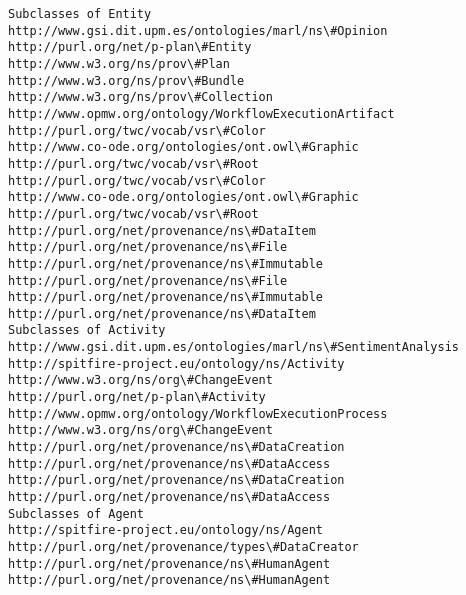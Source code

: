 \documentclass[11pt]{article}
\begin{document}
    \begin{Verbatim}[commandchars=\\\{\}]
Subclasses of Entity
http://www.gsi.dit.upm.es/ontologies/marl/ns\#Opinion
http://purl.org/net/p-plan\#Entity
http://www.w3.org/ns/prov\#Plan
http://www.w3.org/ns/prov\#Bundle
http://www.w3.org/ns/prov\#Collection
http://www.opmw.org/ontology/WorkflowExecutionArtifact
http://purl.org/twc/vocab/vsr\#Color
http://www.co-ode.org/ontologies/ont.owl\#Graphic
http://purl.org/twc/vocab/vsr\#Root
http://purl.org/twc/vocab/vsr\#Color
http://www.co-ode.org/ontologies/ont.owl\#Graphic
http://purl.org/twc/vocab/vsr\#Root
http://purl.org/net/provenance/ns\#DataItem
http://purl.org/net/provenance/ns\#File
http://purl.org/net/provenance/ns\#Immutable
http://purl.org/net/provenance/ns\#File
http://purl.org/net/provenance/ns\#Immutable
http://purl.org/net/provenance/ns\#DataItem
Subclasses of Activity
http://www.gsi.dit.upm.es/ontologies/marl/ns\#SentimentAnalysis
http://spitfire-project.eu/ontology/ns/Activity
http://www.w3.org/ns/org\#ChangeEvent
http://purl.org/net/p-plan\#Activity
http://www.opmw.org/ontology/WorkflowExecutionProcess
http://www.w3.org/ns/org\#ChangeEvent
http://purl.org/net/provenance/ns\#DataCreation
http://purl.org/net/provenance/ns\#DataAccess
http://purl.org/net/provenance/ns\#DataCreation
http://purl.org/net/provenance/ns\#DataAccess
Subclasses of Agent
http://spitfire-project.eu/ontology/ns/Agent
http://purl.org/net/provenance/types\#DataCreator
http://purl.org/net/provenance/ns\#HumanAgent
http://purl.org/net/provenance/ns\#HumanAgent

    \end{Verbatim}


    
    
    
    
\end{document}
